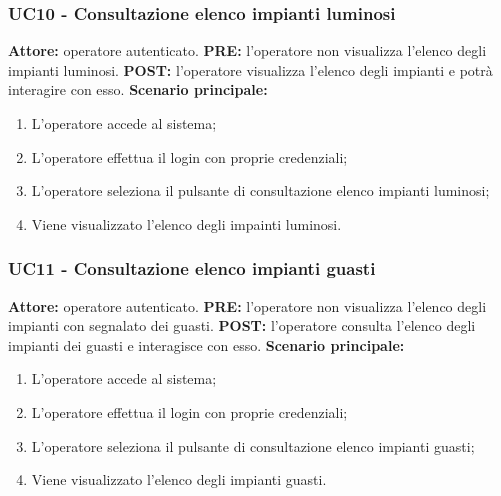 \documentclass[a4paper, 12pt]{article}
\begin{document}
\subsubsection{UC10 - Consultazione elenco impianti luminosi}
\textbf{Attore:} operatore autenticato.\newline
\textbf{PRE:} l'operatore non visualizza l'elenco degli impianti luminosi.\newline
\textbf{POST:} l'operatore visualizza l'elenco degli impianti e potrà interagire con esso.\newline
\textbf{Scenario principale:}
\begin{enumerate}
    \item L'operatore accede al sistema;
    \item L'operatore effettua il login con proprie credenziali;
    \item L'operatore seleziona il pulsante di consultazione elenco impianti luminosi;
    \item Viene visualizzato l'elenco degli impainti luminosi.
\end{enumerate}

\subsubsection{UC11 - Consultazione elenco impianti guasti}
\textbf{Attore:} operatore autenticato.\newline
\textbf{PRE:} l'operatore non visualizza l'elenco degli impianti con segnalato dei guasti.\newline
\textbf{POST:} l'operatore consulta l'elenco degli impianti dei guasti e interagisce con esso.\newline
\textbf{Scenario principale:}
\begin{enumerate}
    \item L'operatore accede al sistema;
    \item L'operatore effettua il login con proprie credenziali;
    \item L'operatore seleziona il pulsante di consultazione elenco impianti guasti;
    \item Viene visualizzato l'elenco degli impianti guasti.
\end{enumerate}
\end{document}
